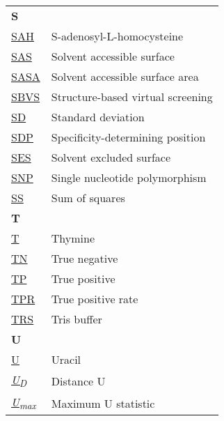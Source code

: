 \begin{longtable}[l]{@{}p{2.5cm}p{12cm}@{}}
\textbf{\large S} & \\[0.25cm]
\textmd{\href{https://www.ebi.ac.uk/pdbe-srv/pdbechem/chemicalCompound/show/SAH}{SAH}} & S-adenosyl-L-homocysteine \\
\textmd{\href{https://en.wikipedia.org/wiki/Accessible_surface_area}{SAS}} & Solvent accessible surface \\
\textmd{\href{https://en.wikipedia.org/wiki/Accessible_surface_area}{SASA}} & Solvent accessible surface area \\
\textmd{\href{https://en.wikipedia.org/wiki/Virtual_screening\#Structure-based_methods_known_protein_ligand_docking}{SBVS}} & Structure-based virtual screening \\
\textmd{\href{https://en.wikipedia.org/wiki/Standard_deviation}{SD}} & Standard deviation \\
\textmd{\href{https://www.nature.com/articles/s42003-024-06117-5}{SDP}} & Specificity-determining position \\
\textmd{\href{https://en.wikipedia.org/wiki/Accessible_surface_area\#Relation_to_solvent-excluded_surface}{SES}} & Solvent excluded surface \\
\textmd{\href{https://en.wikipedia.org/wiki/Single-nucleotide_polymorphism}{SNP}} & Single nucleotide polymorphism \\
\textmd{\href{https://en.wikipedia.org/wiki/Sum_of_squares}{SS}} & Sum of squares \\[0.3175cm]
\textbf{\large T} & \\[0.25cm]
\textmd{\href{https://en.wikipedia.org/wiki/Thymine}{T}} & Thymine \\
\textmd{\href{https://en.wikipedia.org/wiki/False_positives_and_false_negatives}{TN}} & True negative \\
\textmd{\href{https://en.wikipedia.org/wiki/False_positives_and_false_negatives}{TP}} & True positive \\
\textmd{\href{https://en.wikipedia.org/wiki/TPR}{TPR}} & True positive rate \\
\textmd{\href{https://www.ebi.ac.uk/pdbe-srv/pdbechem/chemicalCompound/show/TRS}{TRS}} & Tris buffer \\[0.3175cm]
\textbf{\large U} & \\[0.25cm]
\textmd{\href{https://en.wikipedia.org/wiki/Uracil}{U}} & Uracil \\
\textmd{\href{https://www.nature.com/articles/s42003-024-05970-8}{\textit{U\textsubscript{D}}}} & Distance U \\
\textmd{\href{https://www.nature.com/articles/s42003-024-05970-8}{\textit{U\textsubscript{max}}}} & Maximum U statistic \\

\end{longtable}
